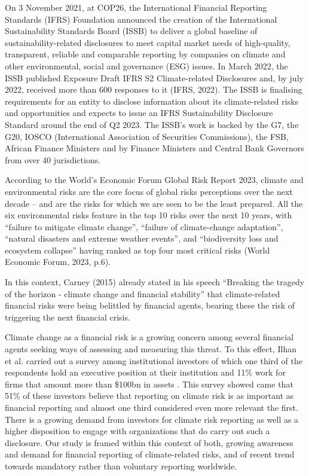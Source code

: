 \documentclass[runningheads]{llncs}
\begin{document}
On 3 November 2021, at COP26, the International Financial Reporting Standards (IFRS) Foundation announced the creation of the International Sustainability Standards Board (ISSB) to deliver a global baseline of sustainability-related disclosures to meet capital market needs of high-quality, transparent, reliable and comparable reporting by companies on climate and other environmental, social and governance (ESG) issues. In March 2022, the ISSB published Exposure Draft IFRS S2 Climate-related Disclosures and, by july 2022, received more than 600 responses to it (IFRS, 2022). The ISSB is finalising requirements for an entity to disclose information about its climate-related risks and opportunities and expects to issue an IFRS Sustainability Disclosure Standard around the end of Q2 2023.  The ISSB’s work is backed by the G7, the G20, IOSCO (International Association of Securities Commissions), the FSB, African Finance Ministers and by Finance Ministers and Central Bank Governors from over 40 jurisdictions.  

According to the World’s Economic Forum Global Risk Report 2023, climate and environmental risks are the core focus of global risks perceptions over the next decade – and are the risks for which we are seen to be the least prepared. All the six environmental risks feature in the top 10 risks over the next 10 years, with “failure to mitigate climate change”, “failure of climate-change adaptation”, “natural disasters and extreme weather events”, and “biodiversity loss and ecosystem collapse” having ranked as top four most critical risks (World Economic Forum, 2023, p.6).  

In this context, Carney (2015) already stated in his speech “Breaking the tragedy of the horizon - climate change and financial stability” that climate-related financial risks were being belittled by financial agents, bearing these the risk of triggering the next financial crisis. 

Climate change as a financial risk is a growing concern among several financial agents seeking ways of assessing and measuring this threat. To this effect, Ilhan et al. \cite{ilhan2021climate} carried out a survey among institutional investors of which one third of the respondents hold an executive position at their institution and 11\% work for firms that amount more than \$100bn in assets . This survey showed came that 51\% of these investors believe that reporting on climate risk is as important as financial reporting and almost one third considered even more relevant the first. There is a growing demand from investors for climate risk reporting as well as a higher disposition to engage with organizations that do carry out such a disclosure. Our study is framed within this context of both, growing awareness and demand for financial reporting of climate-related risks, and of recent trend towards mandatory rather than voluntary reporting worldwide. 
\end{document}
